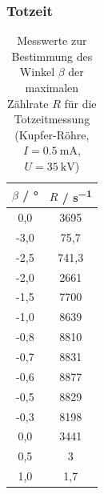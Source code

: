 \documentclass{article}
\begin{document}
\subsubsection{Totzeit}

\begin{table}[H]
    \centering
    \caption{Messwerte zur Bestimmung des Winkel $\beta$ der maximalen Zählrate $R$ für die Totzeitmessung (Kupfer-Röhre, $I = \SI{0,5}{\milli\ampere}$, $U = \SI{35}{\kilo\volt}$)}
    \begin{tabular}{|c|c|}
        \hline
        $\beta$ / \si{\degree} & $R$ / \si{\second \tothe{-1}} \\ \hline \hline
         0,0 & 3695 \\ \hline
         -3,0 & 75,7 \\ \hline
         -2,5 & 741,3 \\ \hline
         -2,0 & 2661 \\ \hline
         -1,5 & 7700 \\ \hline
         -1,0 & 8639 \\ \hline
         -0,8 & 8810 \\ \hline
         -0,7 & 8831 \\ \hline
         -0,6 & 8877 \\ \hline
         -0,5 & 8829 \\ \hline
         -0,3 & 8198 \\ \hline
         0,0 & 3441 \\ \hline
         0,5 & 3 \\ \hline
         1,0 & 1,7 \\ \hline
    \end{tabular}
    \label{tab:MesswerteTotzeitWinkel}
\end{table}
\end{document}
